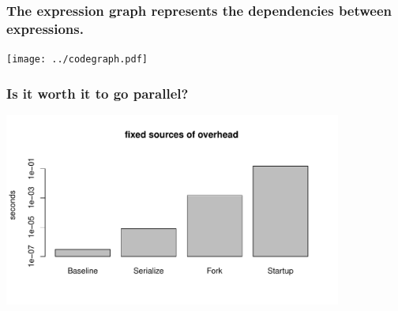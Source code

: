 \documentclass{beamer}
\begin{document}
\begin{frame}

    \frametitle{The expression graph represents the dependencies between
    expressions.}

    \centerline{\texttt{[image: ../codegraph.pdf]}}

\end{frame}
\begin{frame}


\frametitle{Is it worth it to go parallel?}

    \centerline{\includegraphics[height=2.5in]{../compute_times/overhead}}




\end{frame}
\end{document}
